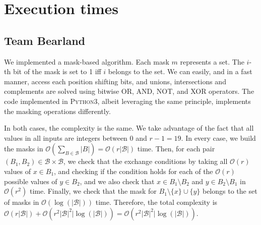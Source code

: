 \documentclass[11pt]{amsart}
\begin{document}
\section{Execution times}

\subsection{Team Bearland}

We implemented a mask-based algorithm.
Each mask $m$ represents a set.
The $i$-th bit of the mask is set to 1 iff $i$ belongs to the set.
We can easily, and in a fast manner, access each position shifting bits, and unions, intersections and complements are solved using bitwise OR, AND, NOT, and XOR operators.
The code implemented in \textsc{Python3}, albeit leveraging the same principle, implements the masking operations differently.
 
In both cases, the complexity is the same. We take advantage of the fact that all values in all inputs are integers between $0$ and $r - 1 = 19$. In every case, we build the masks in $\mathcal{O}(\sum_{B \in \mathcal{B}} |B|) = \mathcal{O}(r|\mathcal{B}|)$ time. Then, for each pair $(B_1, B_2) \in \mathcal{B} \times \mathcal{B}$, we check that the exchange conditions by taking all $\mathcal{O}(r)$ values of $x \in B_1$, and checking if the condition holds for each of the $\mathcal{O}(r)$ possible values of $y \in B_2$, and we also check that $x \in B_1 \setminus B_2$ and $y \in B_2 \setminus B_1$ in $\mathcal{O}(r^2)$ time. Finally, we check that the mask for $B_1 \setminus \{x\} \cup \{y\}$ belongs to the set of masks in $\mathcal{O}(\log(|\mathcal{B}|))$ time. Therefore, the total complexity is $\mathcal{O}(r |\mathcal{B}|) + \mathcal{O}(r^2 |\mathcal{B}|^2| \log(|\mathcal{B}|)) =  \mathcal{O}(r^2 |\mathcal{B}|^2| \log(|\mathcal{B}|))$.
\end{document}
